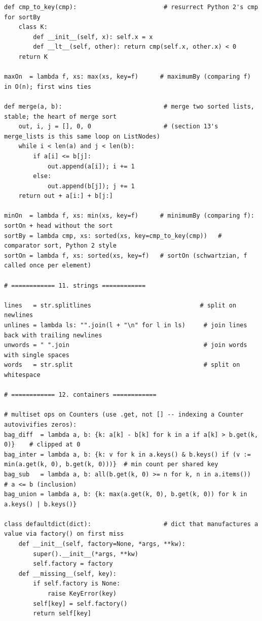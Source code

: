 \documentclass[10pt,letterpaper]{book}
\begin{document}
\begin{lstlisting}[style=file]
def cmp_to_key(cmp):                        # resurrect Python 2's cmp for sortBy
    class K:
        def __init__(self, x): self.x = x
        def __lt__(self, other): return cmp(self.x, other.x) < 0
    return K

maxOn  = lambda f, xs: max(xs, key=f)      # maximumBy (comparing f) in O(n); first wins ties

def merge(a, b):                            # merge two sorted lists, stable; the heart of merge sort
    out, i, j = [], 0, 0                    # (section 13's merge_lists is this same loop on ListNodes)
    while i < len(a) and j < len(b):
        if a[i] <= b[j]:
            out.append(a[i]); i += 1
        else:
            out.append(b[j]); j += 1
    return out + a[i:] + b[j:]

minOn  = lambda f, xs: min(xs, key=f)      # minimumBy (comparing f): sortOn + head without the sort
sortBy = lambda cmp, xs: sorted(xs, key=cmp_to_key(cmp))   # comparator sort, Python 2 style
sortOn = lambda f, xs: sorted(xs, key=f)   # sortOn (schwartzian, f called once per element)

# ============ 11. strings ============

lines   = str.splitlines                              # split on newlines
unlines = lambda ls: "".join(l + "\n" for l in ls)     # join lines back with trailing newlines
unwords = " ".join                                     # join words with single spaces
words   = str.split                                    # split on whitespace

# ============ 12. containers ============

# multiset ops on Counters (use .get, not [] -- indexing a Counter autovivifies zeros):
bag_diff  = lambda a, b: {k: a[k] - b[k] for k in a if a[k] > b.get(k, 0)}    # clipped at 0
bag_inter = lambda a, b: {k: v for k in a.keys() & b.keys() if (v := min(a.get(k, 0), b.get(k, 0)))}  # min count per shared key
bag_sub   = lambda a, b: all(b.get(k, 0) >= n for k, n in a.items())          # a <= b (inclusion)
bag_union = lambda a, b: {k: max(a.get(k, 0), b.get(k, 0)) for k in a.keys() | b.keys()}

class defaultdict(dict):                    # dict that manufactures a value via factory() on first miss
    def __init__(self, factory=None, *args, **kw):
        super().__init__(*args, **kw)
        self.factory = factory
    def __missing__(self, key):
        if self.factory is None:
            raise KeyError(key)
        self[key] = self.factory()
        return self[key]


\end{lstlisting}
\end{document}
